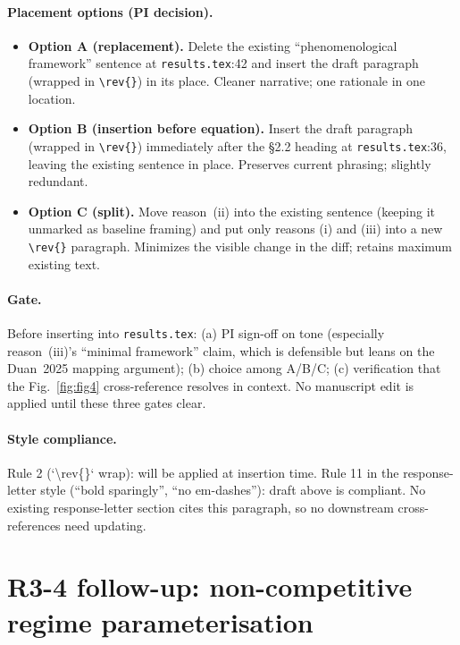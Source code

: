 \documentclass[11pt]{article}
\providecommand{\figref}[1]{Fig.~\ref{#1}}
\begin{document}
\paragraph{Placement options (PI decision).}
\begin{itemize}[itemsep=0pt]
    \item \textbf{Option A (replacement).} Delete the existing ``phenomenological framework'' sentence at \texttt{results.tex}:42 and insert the draft paragraph (wrapped in \texttt{\textbackslash rev\{\}}) in its place. Cleaner narrative; one rationale in one location.
    \item \textbf{Option B (insertion before equation).} Insert the draft paragraph (wrapped in \texttt{\textbackslash rev\{\}}) immediately after the \S2.2 heading at \texttt{results.tex}:36, leaving the existing sentence in place. Preserves current phrasing; slightly redundant.
    \item \textbf{Option C (split).} Move reason~(ii) into the existing sentence (keeping it unmarked as baseline framing) and put only reasons (i) and (iii) into a new \texttt{\textbackslash rev\{\}} paragraph. Minimizes the visible change in the diff; retains maximum existing text.
\end{itemize}

\paragraph{Gate.} Before inserting into \texttt{results.tex}: (a) PI sign-off on tone (especially reason~(iii)'s ``minimal framework'' claim, which is defensible but leans on the Duan~2025 mapping argument); (b) choice among A/B/C; (c) verification that the \figref{fig:fig4} cross-reference resolves in context. No manuscript edit is applied until these three gates clear.

\paragraph{Style compliance.} Rule 2 (`\textbackslash rev\{\}` wrap): will be applied at insertion time. Rule 11 in the response-letter style (``bold sparingly'', ``no em-dashes''): draft above is compliant. No existing response-letter section cites this paragraph, so no downstream cross-references need updating.

\section{R3-4 follow-up: non-competitive regime parameterisation}
\label{sec:r3_4_param}
\end{document}
